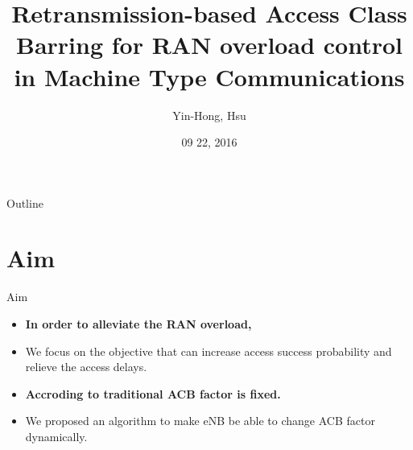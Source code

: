 \documentclass{beamer}
\title {
    Retransmission-based Access Class Barring for RAN overload control in Machine Type Communications
}
\author {
    Yin-Hong, Hsu
}
\date {
    09 22, 2016
}
\begin{document}
\begin{frame}
    \titlepage
\end{frame}


\begin{frame}{Outline}
    \tableofcontentsgather
    \tableofcontents
\end{frame}

\section{Aim}

\begin{frame} {Aim} 
    \begin{itemize}
        \item \textbf{In order to alleviate the RAN overload,}
        \item {We focus on the objective that can increase access success probability and relieve the access delays.}
        \item \textbf{Accroding to traditional ACB factor is fixed.}
        \item {We proposed an algorithm to make eNB be able to change ACB factor dynamically.} 
    \end{itemize}
\end{frame}

\end{document}
